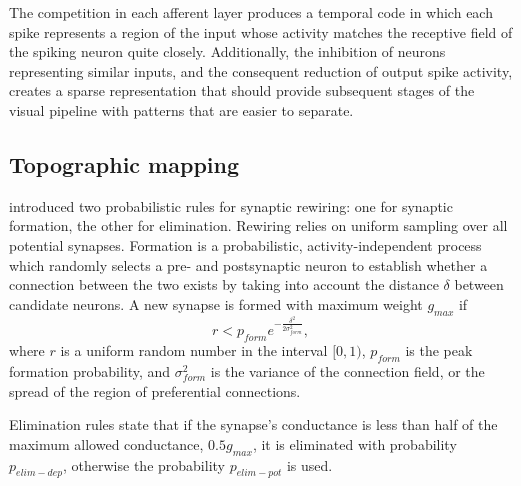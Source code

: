 \documentclass[letterpaper, 10 pt, conference]{ieeeconf}  %
\begin{document}
The competition in each afferent layer produces a temporal code in which each spike represents a region of the input whose activity matches the receptive field of the spiking neuron quite closely.
Additionally, the inhibition of neurons representing similar inputs, and the consequent reduction of output spike activity, creates a sparse representation that should provide subsequent stages of the visual pipeline with patterns that are easier to separate.


\subsection{Topographic mapping}

\cite{bamford2010synaptic} introduced two probabilistic rules for synaptic rewiring: one for synaptic formation, the other for elimination.
Rewiring relies on uniform sampling over all potential synapses. 
Formation is a probabilistic, activity-independent process which randomly selects a pre- and postsynaptic neuron to establish whether a connection between the two exists by taking into account the distance $\delta$ between candidate neurons. A new synapse is formed with maximum weight $g_{max}$ if
%
\begin{equation} \label{eq:formation_rule}
r<p_{form}e^{-\frac{\delta^2}{2\sigma^2_{form}}},
\end{equation}
%
where $r$ is a uniform random number in the interval $[0, 1)$, $p_{form}$ is the peak formation probability, and $\sigma^2_{form}$ is the variance of the connection field, or the spread of the region of preferential connections.

Elimination rules state that if the synapse's conductance is less than half of the maximum allowed conductance, $0.5g_{max}$, it is eliminated with probability $p_{elim-dep}$, otherwise the probability $p_{elim-pot}$ is used.
\end{document}
